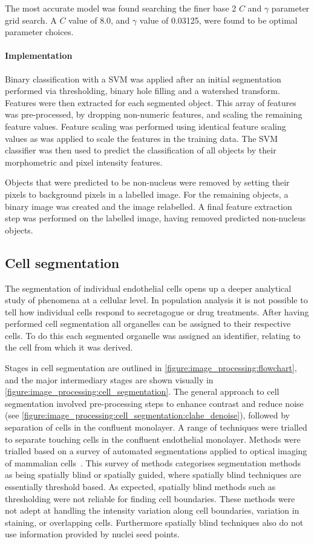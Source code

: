 The most accurate model was found searching the finer base 2 $C$ and $\gamma$ parameter grid search. A $C$ value of 8.0, and $\gamma$ value of 0.03125, were found to be optimal parameter choices.

\paragraph{Implementation}
Binary classification with a SVM was applied after an initial segmentation performed via thresholding, binary hole filling and a watershed transform. Features were then extracted for each segmented object. This array of features was pre-processed, by dropping non-numeric features, and scaling the remaining feature values. Feature scaling was performed using identical feature scaling values as was applied to scale the features in the training data. The SVM classifier was then used to predict the classification of all objects by their morphometric and pixel intensity features.

Objects that were predicted to be non-nucleus were removed by setting their pixels to background pixels in a labelled image. For the remaining objects, a binary image was created and the image relabelled. A final feature extraction step was performed on the labelled image, having removed predicted non-nucleus objects.

\subsection{Cell segmentation}
\label{endothelial_morphometry:image_processing:cell}
The segmentation of individual endothelial cells opens up a deeper analytical study of phenomena at a cellular level. In population analysis it is not possible to tell how individual cells respond to secretagogue or drug treatments. After having performed cell segmentation all organelles can be assigned to their respective cells. To do this each segmented organelle was assigned an identifier, relating to the cell from which it was derived.

Stages in cell segmentation are outlined in \autoref{figure:image_processing:flowchart}, and the major intermediary stages are shown visually in \autoref{figure:image_processing:cell_segmentation}. The general approach to cell segmentation involved pre-processing steps to enhance contrast and reduce noise (see \autoref{figure:image_processing:cell_segmentation:clahe_denoise}), followed by separation of cells in the confluent monolayer. A range of techniques were trialled to separate touching cells in the confluent endothelial monolayer. Methods were trialled based on a survey of automated segmentations applied to optical imaging of mammalian cells~\cite{Bajcsy2015}. This survey of methods categorises segmentation methods as being spatially blind or spatially guided, where spatially blind techniques are essentially threshold based. As expected, spatially blind methods such as thresholding were not reliable for finding cell boundaries. These methods were not adept at handling the intensity variation along cell boundaries, variation in staining, or overlapping cells. Furthermore spatially blind techniques also do not use information provided by nuclei seed points.

